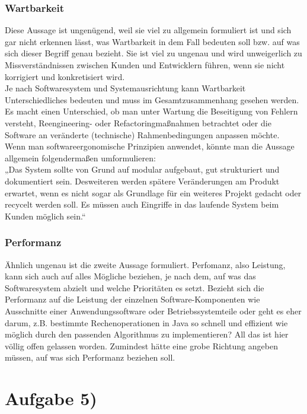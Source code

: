 \documentclass{swp1}
\begin{document}
\subsubsection*{Wartbarkeit}
Diese Aussage ist ungenügend, weil sie viel zu allgemein formuliert ist und sich gar nicht erkennen lässt, was Wartbarkeit in dem Fall bedeuten soll bzw. auf was sich dieser Begriff genau bezieht. Sie ist viel zu ungenau und wird unweigerlich zu Missverständnissen zwischen Kunden und Entwicklern führen, wenn sie nicht korrigiert und konkretisiert wird. \\
Je nach Softwaresystem und Systemausrichtung kann Wartbarkeit Unterschiedliches bedeuten und muss im Gesamtzusammenhang gesehen werden. Es macht einen Unterschied, ob man unter Wartung die Beseitigung von Fehlern versteht, Reengineering- oder Refactoringmaßnahmen betrachtet oder die Software an veränderte (technische) Rahmenbedingungen anpassen möchte. \\
Wenn man softwareergonomische Prinzipien anwendet, könnte man die Aussage allgemein folgendermaßen umformulieren:\\
„Das System sollte von Grund auf modular aufgebaut, gut strukturiert und dokumentiert sein.
Desweiteren werden spätere Veränderungen am Produkt erwartet, wenn es nicht sogar als
Grundlage für ein weiteres Projekt gedacht oder recycelt werden soll. Es müssen auch Eingriffe in
das laufende System beim Kunden möglich sein.“

\subsubsection*{Performanz}
Ähnlich ungenau ist die zweite Aussage formuliert. Perfomanz, also Leistung, kann sich auch auf alles Mögliche beziehen, je nach dem, auf was das Softwaresystem abzielt und welche Prioritäten es setzt. Bezieht sich die Performanz auf die Leistung der einzelnen Software-Komponenten wie Ausschnitte einer Anwendungssoftware oder Betriebssystemteile oder geht es eher darum, z.B. bestimmte Rechenoperationen in Java so schnell und effizient wie möglich durch den passenden Algorithmus zu implementieren? All das ist hier völlig offen gelassen worden. Zumindest hätte eine grobe Richtung angeben müssen, auf was sich Performanz beziehen soll.


\section*{Aufgabe 5)}
\end{document}
